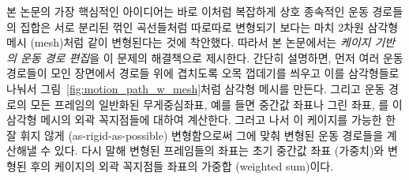 \documentclass[11pt,a4paper,oneside,draft]{report}
\begin{document}
본 논문의 가장 핵심적인 아이디어는 바로 이처럼 복잡하게 상호 종속적인 운동
경로들의 집합은 서로 분리된 꺾인 곡선들처럼 따로따로 변형되기 보다는 마치 2차원
삼각형 메시 (mesh)처럼 같이 변형된다는 것에 착안했다.  따라서 본 논문에서는
\emph{케이지 기반의 운동 경로 편집}을 이 문제의 해결책으로 제시한다. 간단히
설명하면, 먼저 여러 운동 경로들이 모인 장면에서 경로들 위에 겹치도록 오목
껍데기를 씌우고 이를 삼각형들로 나눠서 그림~\ref{fig:motion_path_w_mesh}처럼
삼각형 메시를 만든다. 그리고 운동 경로의 모든 프레임의 일반화된 무게중심좌표,
예를 들면 중간값 좌표나 그린 좌표, 를 이 삼각형 메시의 외곽 꼭지점들에 대하여
계산한다. 그러고 나서 이 케이지를 가능한 한 잘 휘지 않게 (as-rigid-as-possible)
변형함으로써 그에 맞춰 변형된 운동 경로들을 계산해낼 수 있다. 다시 말해 변형된
프레임들의 좌표는 초기 중간값 좌표 (가중치)와 변형된 후의 케이지의 외곽
꼭지점들 좌표의 가중합 (weighted sum)이다.


%

%
%
\end{document}

